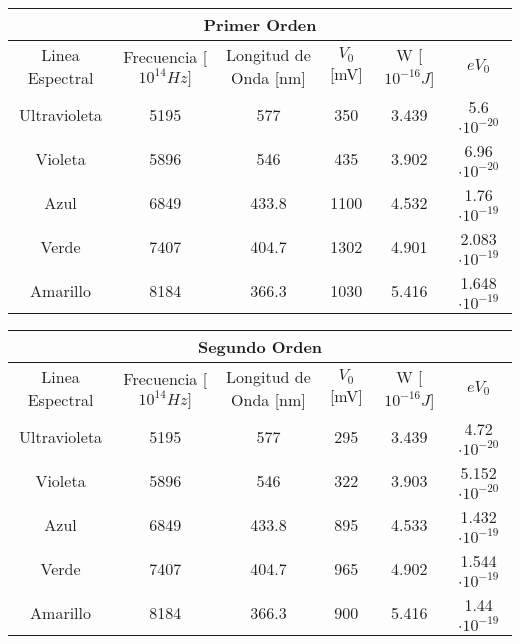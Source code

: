 \documentclass[a4paper,12pt]{report}
\begin{document}
    \begin{table}[htbp!]
        \centering
        \begin{adjustbox}{width=\linewidth}
        \begin{tabular}{|c|c|c|c|c|c|}
        \hline
        \multicolumn{6}{|c|}{Primer Orden} \\
        \hline
        Linea Espectral & Frecuencia [$10^{14} Hz]$ & Longitud de Onda [nm] & $V_0$ [mV]& W [$10^{-16} J$] & $eV_0 $\\
        \hline
        Ultravioleta & 5195 & 577 & 350 & 3.439 & 5.6 $\cdot 10^{-20}$ \\
        \hline
        Violeta & 5896 & 546 & 435 & 3.902 & 6.96 $\cdot 10^{-20}$\\
        \hline
        Azul & 6849 & 433.8 & 1100 & 4.532 & 1.76 $\cdot 10^{-19}$\\
        \hline
        Verde & 7407 & 404.7 & 1302 & 4.901 & 2.083 $\cdot 10^{-19}$\\
        \hline
        Amarillo & 8184 & 366.3 & 1030 & 5.416 & 1.648 $\cdot 10^{-19}$\\
        \hline
        \end{tabular}
        \end{adjustbox}
    \end{table}

    \begin{table}[htbp!]
        \centering
        \begin{adjustbox}{width=\linewidth}
        \begin{tabular}{|c|c|c|c|c|c|}
        \hline
        \multicolumn{6}{|c|}{Segundo Orden} \\
        \hline
        Linea Espectral & Frecuencia [$10^{14} Hz]$ & Longitud de Onda [nm] & $V_0$ [mV]& W [$10^{-16} J$] & $eV_0 $\\
        \hline
        Ultravioleta & 5195 & 577 & 295 & 3.439 & 4.72 $\cdot 10^{-20}$\\
        \hline
        Violeta & 5896 & 546 & 322 & 3.903 & 5.152 $\cdot 10^{-20}$\\
        \hline
        Azul & 6849 & 433.8 & 895 & 4.533 & 1.432 $\cdot 10^{-19}$\\
        \hline
        Verde & 7407 & 404.7 & 965 & 4.902 & 1.544 $\cdot 10^{-19}$\\
        \hline
        Amarillo & 8184 & 366.3 & 900 & 5.416 & 1.44 $\cdot 10^{-19}$\\
        \hline
        \end{tabular}
        \end{adjustbox}
    \end{table}
\end{document}
